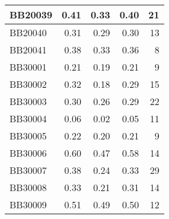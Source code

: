 \begin{longtable}{|l|r|r|r||r|}
	\hline
	BB20039 & \cellcolor[rgb]{ .988,  1,  .992}0.41 & \cellcolor[rgb]{ .384,  .745,  .478}0.33 & \cellcolor[rgb]{ .89,  .957,  .91}0.40 & \cellcolor[rgb]{ .98,  .588,  .596}21 \\
	\hline
	BB20040 & \cellcolor[rgb]{ .988,  1,  .992}0.31 & \cellcolor[rgb]{ .384,  .745,  .478}0.29 & \cellcolor[rgb]{ .776,  .91,  .812}0.30 & \cellcolor[rgb]{ .984,  .741,  .749}13 \\
	\hline
	BB20041 & \cellcolor[rgb]{ .988,  1,  .992}0.38 & \cellcolor[rgb]{ .384,  .745,  .478}0.33 & \cellcolor[rgb]{ .796,  .918,  .831}0.36 & \cellcolor[rgb]{ .984,  .835,  .847}8 \\
	\hline
	BB30001 & \cellcolor[rgb]{ .988,  1,  .992}0.21 & \cellcolor[rgb]{ .384,  .745,  .478}0.19 & \cellcolor[rgb]{ .886,  .957,  .906}0.21 & \cellcolor[rgb]{ .984,  .816,  .827}9 \\
	\hline
	BB30002 & \cellcolor[rgb]{ .988,  1,  .992}0.32 & \cellcolor[rgb]{ .384,  .745,  .478}0.18 & \cellcolor[rgb]{ .847,  .937,  .871}0.29 & \cellcolor[rgb]{ .98,  .702,  .71}15 \\
	\hline
	BB30003 & \cellcolor[rgb]{ .988,  1,  .992}0.30 & \cellcolor[rgb]{ .384,  .745,  .478}0.26 & \cellcolor[rgb]{ .773,  .906,  .808}0.29 & \cellcolor[rgb]{ .98,  .569,  .576}22 \\
	\hline
	BB30004 & \cellcolor[rgb]{ .988,  1,  .992}0.06 & \cellcolor[rgb]{ .384,  .745,  .478}0.02 & \cellcolor[rgb]{ .796,  .918,  .827}0.05 & \cellcolor[rgb]{ .984,  .78,  .788}11 \\
	\hline
	BB30005 & \cellcolor[rgb]{ .988,  1,  .992}0.22 & \cellcolor[rgb]{ .384,  .745,  .478}0.20 & \cellcolor[rgb]{ .82,  .925,  .847}0.21 & \cellcolor[rgb]{ .984,  .816,  .827}9 \\
	\hline
	BB30006 & \cellcolor[rgb]{ .988,  1,  .992}0.60 & \cellcolor[rgb]{ .384,  .745,  .478}0.47 & \cellcolor[rgb]{ .878,  .953,  .898}0.58 & \cellcolor[rgb]{ .984,  .722,  .729}14 \\
	\hline
	BB30007 & \cellcolor[rgb]{ .988,  1,  .992}0.38 & \cellcolor[rgb]{ .384,  .745,  .478}0.24 & \cellcolor[rgb]{ .784,  .914,  .82}0.33 & \cellcolor[rgb]{ .976,  .431,  .439}29 \\
	\hline
	BB30008 & \cellcolor[rgb]{ .988,  1,  .992}0.33 & \cellcolor[rgb]{ .384,  .745,  .478}0.21 & \cellcolor[rgb]{ .878,  .953,  .898}0.31 & \cellcolor[rgb]{ .984,  .722,  .729}14 \\
	\hline
	BB30009 & \cellcolor[rgb]{ .988,  1,  .992}0.51 & \cellcolor[rgb]{ .384,  .745,  .478}0.49 & \cellcolor[rgb]{ .784,  .914,  .82}0.50 & \cellcolor[rgb]{ .984,  .761,  .769}12 \\

\end{longtable}

